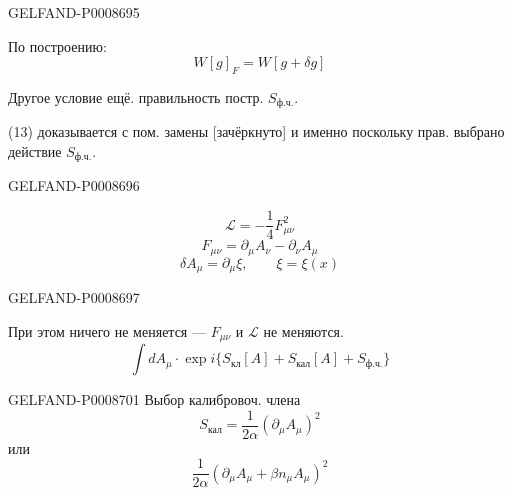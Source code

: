 \begin{GelfandAdjacentEvidence}{GELFAND-P000869}{5}


По построению:
\begin{equation*}
W[g]_F=W[g+\delta g]
\tag{21}
\end{equation*}

Другое условие ещё. правильность постр. $S_{\text{ф.ч.}}$.

(13) доказывается с пом. замены [зачёркнуто] и именно поскольку прав. выбрано действие $S_{\text{ф.ч.}}$.
\end{GelfandAdjacentEvidence}
\begin{GelfandAdjacentEvidence}{GELFAND-P000869}{6}


\begin{equation*}
\mathcal L=-\frac14F_{\mu\nu}^2
\tag{22}
\end{equation*}
\begin{equation*}
F_{\mu\nu}=\partial_\mu A_\nu-\partial_\nu A_\mu
\tag{23}
\end{equation*}
\begin{equation*}
\delta A_\mu=\partial_\mu\xi,\qquad \xi=\xi(x)
\tag{24}
\end{equation*}
\end{GelfandAdjacentEvidence}
\begin{GelfandAdjacentEvidence}{GELFAND-P000869}{7}

\end{GelfandAdjacentEvidence}


При этом ничего не меняется --- $F_{\mu\nu}$ и $\mathcal L$ не меняются.
\begin{equation*}
\int dA_\mu\cdot\exp i\{S_{\text{кл}}[A]+S_{\text{кал}}[A]+S_{\text{ф.ч.}}\}
\tag{25}
\end{equation*}


\begin{GelfandAdjacentEvidence}{GELFAND-P000870}{1}
Выбор калибровоч. члена
\begin{equation*}
S_{\text{кал}}=\frac1{2\alpha}(\partial_\mu A_\mu)^2
\tag{26}
\end{equation*}
или
\begin{equation*}
\frac1{2\alpha}(\partial_\mu A_\mu+\beta n_\mu A_\mu)^2
\tag{27}
\end{equation*}
\end{GelfandAdjacentEvidence}


